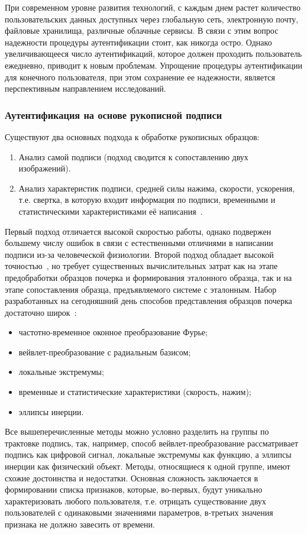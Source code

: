 При современном уровне развития технологий, с каждым днем растет количество пользовательских данных доступных через глобальную сеть, электронную почту, файловые хранилища, различные облачные сервисы. В связи с этим вопрос надежности процедуры аутентификации стоит, как никогда остро. Однако увеличивающееся число аутентификаций, которое должен проходить пользователь ежедневно, приводит к новым проблемам. Упрощение процедуры аутентификации для конечного пользователя, при этом сохранение ее надежности, является перспективным направлением исследований.
\subsubsection{Аутентификация на основе рукописной подписи}
Существуют два основных подхода к обработке рукописных образцов:
\begin{enumerate}
  \item Анализ самой подписи (подход сводится к сопоставлению двух изображений).
  \item Анализ характеристик подписи, средней силы нажима, скорости, ускорения, т.е. свертка, в которую входит информация по подписи, временными и статистическими характеристиками её написания~\cite{bryxomickii}.
\end{enumerate}

Первый подход отличается высокой скоростью работы, однако подвержен большему числу ошибок в связи с естественными отличиями в написании подписи из-за человеческой физиологии.
Второй подход обладает высокой точностью~\cite{nelson_kishon}, но требует существенных вычислительных затрат как на этапе предобработки образцов почерка и формирования эталонного образца, так и на этапе сопоставления образца, предъявляемого системе с эталонным.
Набор разработанных на сегодняшний день способов представления образцов почерка достаточно широк~\cite{ivanov_korparate_network}:
\begin{itemize}
  \item частотно-временное оконное преобразование Фурье;
  \item вейвлет-преобразование с радиальным базисом;
  \item локальные экстремумы;
  \item временные и статистические характеристики (скорость, нажим);
  \item эллипсы инерции.
\end{itemize}

Все вышеперечисленные методы можно условно разделить на группы по трактовке подпись, так, например, способ вейвлет-преобразование рассматривает подпись как цифровой сигнал, локальные экстремумы как функцию, а эллипсы инерции как физический объект. Методы, относящиеся к одной группе, имеют схожие достоинства и недостатки.
Основная сложность заключается в формировании списка признаков, которые, во-первых, будут уникально характеризовать любого пользователя, т.е. отрицать существование двух пользователей с одинаковыми значениями параметров, в-третьих значения признака не должно завесить от времени.
